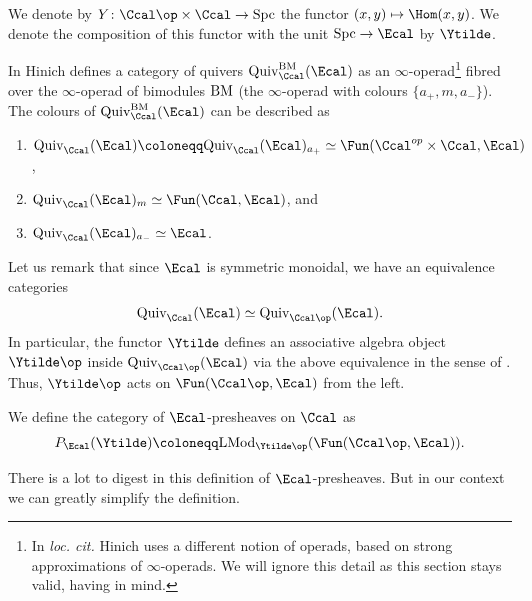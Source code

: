 \documentclass[colorinlistoftodos,article,11pt,reqno]{article}
\newcommand{\Spc}{\textup{Spc}}
\begin{document}
\begin{appendix}
\begin{notation}
    We denote by $Y\colon \Ccal\op\times \Ccal\rightarrow \Spc$ the functor $(x,y)\mapsto \Hom(x,y)$. We denote the composition of this functor with the unit $\Spc\rightarrow \Ecal$ by $\Ytilde$.
\end{notation}

In \cite[\S 3.1.3]{Hinich} Hinich defines a category of quivers $\textup{Quiv}_{\Ccal}^{\textup{BM}}(\Ecal)$ as an $\infty$-operad\footnote{In \textit{loc.\! cit.} Hinich uses a different notion of operads, based on strong approximations of $\infty$-operads. We will ignore this detail as this section stays valid, having \cite[\S 2.7]{Hinich} in mind.} fibred over the $\infty$-operad of bimodules $\textup{BM}$ (the $\infty$-operad with colours $\lbrace a_{+},m,a_{-}\rbrace$). The colours of $\textup{Quiv}_{\Ccal}^{\textup{BM}}(\Ecal)$ can be described as
\begin{enumerate}
    \item[$\bullet$] $\textup{Quiv}_{\Ccal}(\Ecal)\coloneqq\textup{Quiv}_{\Ccal}(\Ecal)_{a_{+}} \simeq \Fun(\Ccal^{op}\times \Ccal,\Ecal)$,
    \item[$\bullet$]  $\textup{Quiv}_{\Ccal}(\Ecal)_{m} \simeq \Fun(\Ccal,\Ecal)$, and 
    \item[$\bullet$] $\textup{Quiv}_{\Ccal}(\Ecal)_{a_{-}}\simeq\Ecal$.
\end{enumerate}

Let us remark that since $\Ecal$ is symmetric monoidal, we have an equivalence categories 
$$
    \textup{Quiv}_{\Ccal}(\Ecal)\simeq \textup{Quiv}_{\Ccal\op}(\Ecal).
$$
In particular, the functor $\Ytilde$ defines an associative algebra object $\Ytilde\op$ inside $\textup{Quiv}_{\Ccal\op}(\Ecal)$ via the above equivalence in the sense of \cite{Hinich}. Thus, $\Ytilde\op$ acts on $\Fun(\Ccal\op,\Ecal)$ from the left. 
\begin{defi}
    We define the category of $\Ecal$-presheaves on $\Ccal$ as 
    $$
        P_{\Ecal}(\Ytilde) \coloneqq \textup{LMod}_{\Ytilde\op}(\Fun(\Ccal\op,\Ecal)).
    $$
\end{defi}
There is a lot to digest in this definition of $\Ecal$-presheaves. But in our context we can greatly simplify the definition. 


\end{appendix}
\end{document}
